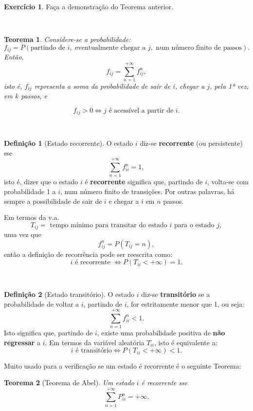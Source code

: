 \documentclass[
  11pt,
  a4paper,
]{book}
\newtheorem{theorem}{Teorema}[chapter]
\theoremstyle{definition}
\newtheorem{definition}{Definição}[chapter]
\theoremstyle{definition}
\theoremstyle{definition}
\newtheorem{exercise}{Exercício}[chapter]
\theoremstyle{definition}
\theoremstyle{remark}
\begin{document}
\begin{exercise}
Faça a demonstração do Teorema anterior.
\end{exercise}

\(\,\)

\begin{theorem}
Considere-se a probabilidade:
\[f_{ij}=P(\text{partindo de } i, \text{ eventualmente chegar a } j, \text{ num número finito de passos}).\]
Então,
\[f_{ij}=\sum\limits_{n=1}^{+\infty}f_{ij}^n,\]
isto é, \(f_{ij}\) representa a soma da probabilidade de sair de \(i\), chegar a \(j\), pela 1ª vez, em \(k\) passos, e

\[f_{ij}>0 \iff j \text{ é acessível a partir de } i.\]
\end{theorem}

\(\,\)

\begin{definition}[Estado recorrente]
O estado \(i\) diz-se \textbf{recorrente} (ou persistente) sse
\[\sum\limits_{n=1}^{+\infty}f_{ii}^n=1,\]
isto é, dizer que o estado \(i\) é \textbf{recorrente} significa que, partindo de \(i\), volta-se com probabilidade 1 a \(i\), num número finito de transições. Por outras palavras, há sempre a possibilidade de sair de \(i\) e chegar a \(i\) em \(n\) passos.

Em termos da v.a.
\[T_{ij}= \text{ tempo mínimo para transitar do estado } i \text{ para o estado } j,\]
uma vez que
\[f_{ij}^n=P(T_{ij}=n),\]
então a definição de recorrência pode ser reescrita como:
\[i \text{ é recorrente } \iff P(T_{ii}<+\infty)=1.\]
\end{definition}

\(\,\)

\begin{definition}[Estado transitório]
O estado \(i\) diz-se \textbf{transitório} se a probabilidade de voltar a \(i\), partindo de \(i\), for estritamente menor que 1, ou seja:
\[
\sum_{n=1}^{+\infty} f_{ii}^n < 1.
\]
Isto significa que, partindo de \(i\), existe uma probabilidade positiva de \textbf{não regressar} a \(i\). Em termos da variável aleatória \(T_{ii}\), isto é equivalente a:
\[
i \text{ é transitório} \iff P(T_{ii} < +\infty) < 1.
\]
\end{definition}

Muito usado para a verificação se um estado é recorrente é o seguinte Teorema:

\begin{theorem}[Teorema de Abel]
Um estado \(i\) é recorrente sse
\[\sum\limits_{n=1}^{+\infty}P_{ii}^n=+\infty.\]
\end{theorem}
\end{document}
